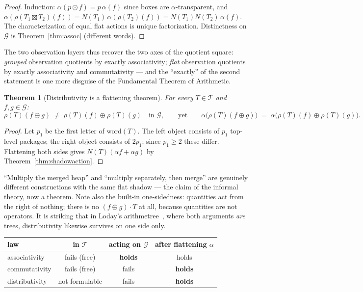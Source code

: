 \documentclass[11pt]{article}
\newcommand{\cT}{\mathcal{T}}   %
\newcommand{\cG}{\mathcal{G}}   %
\newcommand{\act}{\rho}
\numberwithin{equation}{section}
\theoremstyle{plain}
\newtheorem{theorem}{Theorem}[section]
\theoremstyle{definition}
\theoremstyle{remark}
\begin{document}
\begin{proof}
Induction: $\alpha(p \odot f) = p\,\alpha(f)$ since boxes are $\alpha$-transparent, and
$\alpha(\act(T_1\boxtimes T_2)(f)) = N(T_1)\,\alpha(\act(T_2)(f)) =
N(T_1)N(T_2)\,\alpha(f)$. The characterization of equal flat actions is unique
factorization. Distinctness on $\cG$ is Theorem~\ref{thm:assoc} (different words).
\end{proof}

The two observation layers thus recover the two axes of the quotient square:
\emph{grouped} observation quotients by exactly associativity; \emph{flat} observation
quotients by exactly associativity and commutativity --- and the ``exactly'' of the
second statement is one more disguise of the Fundamental Theorem of Arithmetic.

\begin{theorem}[Distributivity is a flattening theorem]\label{thm:distrib}
For every $T \in \cT$ and $f, g \in \cG$:
\[
\act(T)(f \oplus g) \;\neq\; \act(T)(f) \oplus \act(T)(g)
\quad\text{in } \cG,
\qquad\text{yet}\qquad
\alpha\bigl(\act(T)(f \oplus g)\bigr) \;=\;
\alpha\bigl(\act(T)(f) \oplus \act(T)(g)\bigr).
\]
\end{theorem}

\begin{proof}
Let $p_1$ be the first letter of $\mathrm{word}(T)$. The left object consists of $p_1$
top-level packages; the right object consists of $2p_1$; since $p_1 \ge 2$ these
differ. Flattening both sides gives $N(T)(\alpha f + \alpha g)$ by
Theorem~\ref{thm:shadowaction}.
\end{proof}

``Multiply the merged heap'' and ``multiply separately, then merge'' are genuinely
different constructions with the same flat shadow --- the claim of the informal theory,
now a theorem. Note also the built-in one-sidedness: quantities act from the right of
nothing; there is no $(f \oplus g) \cdot T$ at all, because quantities are not
operators. It is striking that in Loday's arithmetree~\cite{loday}, where both arguments
\emph{are} trees, distributivity likewise survives on one side only.

\begin{center}
\begin{tabular}{@{}lccc@{}}
\toprule
law & in $\cT$ & acting on $\cG$ & after flattening $\alpha$ \\
\midrule
associativity & fails (free) & \textbf{holds} & holds \\
commutativity & fails (free) & fails & \textbf{holds} \\
distributivity & not formulable & fails & \textbf{holds} \\
\bottomrule
\end{tabular}
\end{center}
\end{document}
